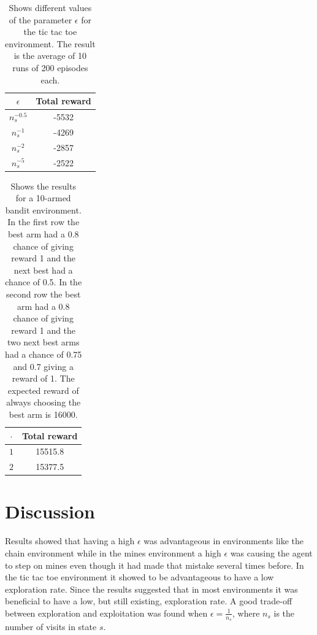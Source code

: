 \documentclass[11pt]{article}
\numberwithin{equation}{section}
\begin{document}
\begin{flushleft}
\begin{table}[H]
\caption{Shows different values of the parameter $\epsilon$ for the tic tac toe environment. The result is the average of 10 runs of 200 episodes each.}
\begin{center}
\begin{tabular}{|c|c|}
\hline
$\epsilon$ & Total reward \\ \hline
$n_s^{-0.5}$ & -5532 \\ \hline
$n_s^{-1}$ & -4269 \\ \hline
$n_s^{-2}$ & -2857 \\ \hline
$n_s^{-5}$ & -2522 \\
\hline
\end{tabular}
\label{tab:tttMean}
\end{center}
\end{table}

\begin{table}[H]
\caption{Shows the results for a 10-armed bandit environment. In the first row the best arm had a 0.8 chance of giving reward 1 and the next best had a chance of 0.5. In the second row the best arm had a 0.8 chance of giving reward 1 and the two next best arms had a chance of 0.75 and 0.7 giving a reward of 1. The expected reward of always choosing the best arm is 16000.}
\begin{center}
\begin{tabular}{|c|c|}
\hline
$\cdot$ & Total reward \\ \hline
$1$ & 15515.8 \\ \hline
$2$ & 15377.5 \\
\hline
\end{tabular}
\label{tab:UCBMean}
\end{center}
\end{table}

\section{Discussion}

Results showed that having a high $\epsilon$ was advantageous in environments like the chain environment while in the mines environment a high $\epsilon$ was causing the agent to step on mines even though it had made that mistake several times before. In the tic tac toe environment it showed to be advantageous to have a low exploration rate. Since the results suggested that in most environments it was beneficial to have a low, but still existing, exploration rate. A good trade-off between exploration and exploitation was found when $\epsilon = \frac{1}{n_s}$, where $n_s$ is the number of visits in state $s$. \newline 


\end{flushleft}
\end{document}
